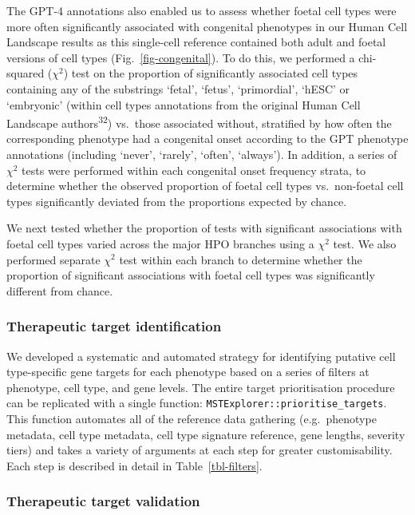 \documentclass[
]{agujournal2019}
\begin{document}
The GPT-4 annotations also enabled us to assess whether foetal cell
types were more often significantly associated with congenital
phenotypes in our Human Cell Landscape results as this single-cell
reference contained both adult and foetal versions of cell types
(Fig.~\ref{fig-congenital}). To do this, we performed a chi-squared
(\(\chi^2\)) test on the proportion of significantly associated cell
types containing any of the substrings `fetal', `fetus', `primordial',
`hESC' or `embryonic' (within cell types annotations from the original
Human Cell Landscape authors\textsuperscript{32}) vs.~those associated
without, stratified by how often the corresponding phenotype had a
congenital onset according to the GPT phenotype annotations (including
`never', `rarely', `often', `always'). In addition, a series of
\(\chi^2\) tests were performed within each congenital onset frequency
strata, to determine whether the observed proportion of foetal cell
types vs.~non-foetal cell types significantly deviated from the
proportions expected by chance.

We next tested whether the proportion of tests with significant
associations with foetal cell types varied across the major HPO branches
using a \(\chi^2\) test. We also performed separate \(\chi^2\) test
within each branch to determine whether the proportion of significant
associations with foetal cell types was significantly different from
chance.

\subsubsection{Therapeutic target
identification}\label{therapeutic-target-identification-1}

We developed a systematic and automated strategy for identifying
putative cell type-specific gene targets for each phenotype based on a
series of filters at phenotype, cell type, and gene levels. The entire
target prioritisation procedure can be replicated with a single
function: \texttt{MSTExplorer::prioritise\_targets}. This function
automates all of the reference data gathering (e.g.~phenotype metadata,
cell type metadata, cell type signature reference, gene lengths,
severity tiers) and takes a variety of arguments at each step for
greater customisability. Each step is described in detail in
Table~\ref{tbl-filters}.

\subsubsection{Therapeutic target
validation}\label{therapeutic-target-validation-1}
\end{document}

